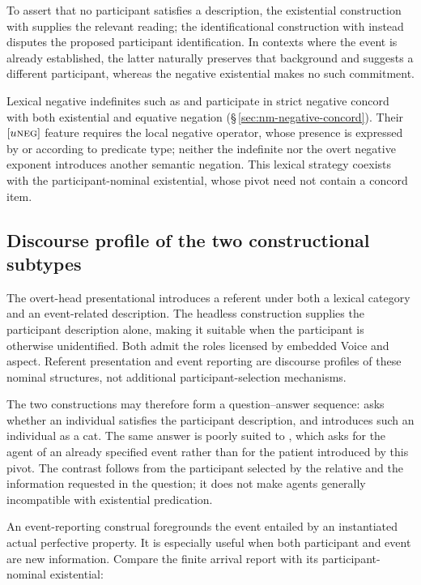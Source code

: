 To assert that no participant satisfies a description, the existential
construction with  supplies the relevant reading; the identificational
construction with  instead disputes the proposed participant
identification. In contexts where the event is already established, the latter
naturally preserves that background and suggests a different participant,
whereas the negative existential makes no such commitment.

Lexical negative indefinites such as   and
  participate in strict negative concord with both
existential and equative negation (§\,\ref{sec:nm-negative-concord}). Their $[u\textsc{neg}]$ feature requires the local negative
operator, whose presence is expressed by  or  according
to predicate type; neither the indefinite nor the overt negative exponent
introduces another semantic negation. This lexical strategy coexists with the
participant-nominal existential, whose pivot need not contain a concord item.

\subsection{Discourse profile of the two constructional subtypes}
\label{sec:exst-discourse}

The overt-head presentational introduces a referent under both a lexical
category and an event-related description. The headless construction supplies
the participant description alone, making it suitable when the participant is
otherwise unidentified. Both admit the roles licensed by embedded Voice and
aspect. Referent presentation and event reporting are discourse profiles of
these nominal structures, not additional participant-selection mechanisms.

The two constructions may therefore form a question--answer sequence:
  asks whether an
individual satisfies the participant description, and   introduces such an individual as a
cat. The same answer is poorly suited to , which asks
for the agent of an already specified event rather than for the patient
introduced by this pivot. The contrast follows from the participant selected
by the relative and the information requested in the question; it does not
make agents generally incompatible with existential predication.

An event-reporting construal foregrounds the event entailed by an instantiated
actual perfective property. It is especially useful when both participant and
event are new information. Compare the finite arrival report with its
participant-nominal existential:

